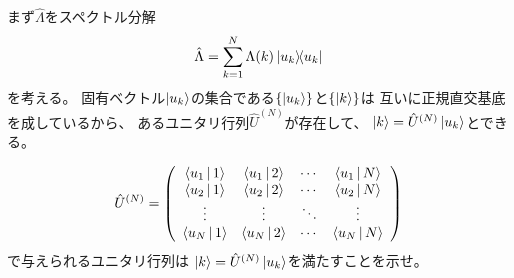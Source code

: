 \documentclass[a4paper, 10pt]{jsarticle}
\begin{document}
まず$\hat{\Lambda}$をスペクトル分解
\begin{align}
	\hat{\Lambda}
	= \sum_{k=1}^N \Lambda(k) \Ket{u_k} \! \! \Bra{u_k}
	\label{ラムダのスペクトル分解}
\end{align}
を考える。
固有ベクトル$\Ket{u_k}$の集合である$\{\Ket{u_k}\}$と$\{\Ket{k}\}$は
互いに正規直交基底を成しているから、
あるユニタリ行列$\hat{U}^{(N)}$が存在して、
$\Ket{k} = \hat{U}^{(N)} \Ket{u_k}$とできる。
\begin{problem}
	\begin{align}
		\hat{U}^{(N)}
		= \left( \begin{array}{cccc}
			\Braket{u_1 | 1} & \Braket{u_1 | 2} & \cdots & \Braket{u_1 | N} \\
			\Braket{u_2 | 1} & \Braket{u_2 | 2} & \cdots & \Braket{u_2 | N} \\
			\vdots & \vdots & \ddots & \vdots \\
			\Braket{u_N | 1} & \Braket{u_N | 2} & \cdots & \Braket{u_N | N}
		\end{array} \right)
	\end{align}
	で与えられるユニタリ行列は
	$\Ket{k} = \hat{U}^{(N)} \Ket{u_k}$を満たすことを示せ。

	\tcblower


\end{problem}
\end{document}
